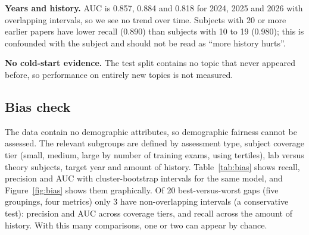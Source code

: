 \documentclass[11pt,a4paper]{article}
\begin{document}
\textbf{Years and history.} AUC is 0.857, 0.884 and 0.818 for 2024, 2025 and 2026 with overlapping intervals, so we see no
trend over time. Subjects with 20 or more earlier papers have lower recall (0.890) than subjects with 10 to 19 (0.980); this is
confounded with the subject and should not be read as ``more history hurts''.

\textbf{No cold-start evidence.} The test split contains no topic that never appeared before, so performance on entirely
new topics is not measured.

\subsection{Bias check}
\label{sec:bias}
The data contain no demographic attributes, so demographic fairness cannot be assessed. The relevant subgroups are defined by
assessment type, subject coverage tier (small, medium, large by number of training exams, using tertiles), lab versus
theory subjects, target year and amount of history. Table~\ref{tab:bias} shows recall, precision and AUC with
cluster-bootstrap intervals for the same model, and Figure~\ref{fig:bias} shows them graphically. Of 20 best-versus-worst gaps
(five groupings, four metrics) only 3 have non-overlapping intervals (a conservative test): precision and AUC across coverage
tiers, and recall across the amount of history. With this many comparisons, one or two can appear by chance.
\end{document}
